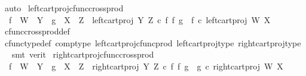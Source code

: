 \begin{isabellebody}
\ auto%
\endisatagproof
{\isafoldproof}%
%
\isadelimproof
\isanewline
%
\endisadelimproof
\isanewline
{}\isamarkupfalse%
\ left{\isacharunderscore}{\kern0pt}cart{\isacharunderscore}{\kern0pt}proj{\isacharunderscore}{\kern0pt}cfunc{\isacharunderscore}{\kern0pt}cross{\isacharunderscore}{\kern0pt}prod{\isacharcolon}{\kern0pt}\isanewline
\ \ {\isachardoublequoteopen}f\ {\isacharcolon}{\kern0pt}\ W\ {\isasymrightarrow}\ Y\ {\isasymLongrightarrow}\ g\ {\isacharcolon}{\kern0pt}\ X\ {\isasymrightarrow}\ Z\ {\isasymLongrightarrow}\ left{\isacharunderscore}{\kern0pt}cart{\isacharunderscore}{\kern0pt}proj\ Y\ Z\ {\isasymcirc}\isactrlsub c\ f\ {\isasymtimes}\isactrlsub f\ g\ {\isacharequal}{\kern0pt}\ f\ {\isasymcirc}\isactrlsub c\ left{\isacharunderscore}{\kern0pt}cart{\isacharunderscore}{\kern0pt}proj\ W\ X{\isachardoublequoteclose}\isanewline
%
\isadelimproof
\ \ %
\endisadelimproof
%
\isatagproof
{}\isamarkupfalse%
\ cfunc{\isacharunderscore}{\kern0pt}cross{\isacharunderscore}{\kern0pt}prod{\isacharunderscore}{\kern0pt}def\isanewline
\ \ \isamarkupfalse%
\ cfunc{\isacharunderscore}{\kern0pt}type{\isacharunderscore}{\kern0pt}def\ comp{\isacharunderscore}{\kern0pt}type\ left{\isacharunderscore}{\kern0pt}cart{\isacharunderscore}{\kern0pt}proj{\isacharunderscore}{\kern0pt}cfunc{\isacharunderscore}{\kern0pt}prod\ left{\isacharunderscore}{\kern0pt}cart{\isacharunderscore}{\kern0pt}proj{\isacharunderscore}{\kern0pt}type\ right{\isacharunderscore}{\kern0pt}cart{\isacharunderscore}{\kern0pt}proj{\isacharunderscore}{\kern0pt}type\ \isamarkupfalse%
\ {\isacharparenleft}{\kern0pt}smt\ {\isacharparenleft}{\kern0pt}verit{\isacharparenright}{\kern0pt}{\isacharparenright}{\kern0pt}%
\endisatagproof
{\isafoldproof}%
%
\isadelimproof
\isanewline
%
\endisadelimproof
\isanewline
{}\isamarkupfalse%
\ right{\isacharunderscore}{\kern0pt}cart{\isacharunderscore}{\kern0pt}proj{\isacharunderscore}{\kern0pt}cfunc{\isacharunderscore}{\kern0pt}cross{\isacharunderscore}{\kern0pt}prod{\isacharcolon}{\kern0pt}\isanewline
\ \ {\isachardoublequoteopen}f\ {\isacharcolon}{\kern0pt}\ W\ {\isasymrightarrow}\ Y\ {\isasymLongrightarrow}\ g\ {\isacharcolon}{\kern0pt}\ X\ {\isasymrightarrow}\ Z\ {\isasymLongrightarrow}\ right{\isacharunderscore}{\kern0pt}cart{\isacharunderscore}{\kern0pt}proj\ Y\ Z\ {\isasymcirc}\isactrlsub c\ f\ {\isasymtimes}\isactrlsub f\ g\ {\isacharequal}{\kern0pt}\ g\ {\isasymcirc}\isactrlsub c\ right{\isacharunderscore}{\kern0pt}cart{\isacharunderscore}{\kern0pt}proj\ W\ X{\isachardoublequoteclose}\isanewline

\end{isabellebody}
